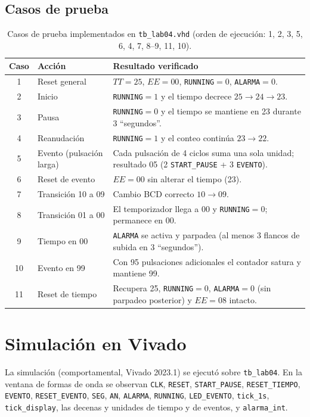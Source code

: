 \documentclass[letterpaper,12pt]{article}
\begin{document}
\subsection{Casos de prueba}
\begin{table}[H]
\centering
\caption{Casos de prueba implementados en \texttt{tb\_lab04.vhd} (orden de ejecución: 1, 2, 3, 5, 6, 4, 7, 8--9, 11, 10).}
\label{tab:casos}
\small
\begin{tabularx}{\textwidth}{|c|l|X|}
\hline
\textbf{Caso} & \textbf{Acción} & \textbf{Resultado verificado} \\ \hline
1  & Reset general & $TT=25$, $EE=00$, \texttt{RUNNING}$=0$, \texttt{ALARMA}$=0$. \\ \hline
2  & Inicio & \texttt{RUNNING}$=1$ y el tiempo decrece $25\rightarrow24\rightarrow23$. \\ \hline
3  & Pausa & \texttt{RUNNING}$=0$ y el tiempo se mantiene en 23 durante 3 ``segundos''. \\ \hline
4  & Reanudación & \texttt{RUNNING}$=1$ y el conteo continúa $23\rightarrow22$. \\ \hline
5  & Evento (pulsación larga) & Cada pulsación de 4 ciclos suma una sola unidad; resultado 05 (2 \texttt{START\_PAUSE} + 3 \texttt{EVENTO}). \\ \hline
6  & Reset de evento & $EE=00$ sin alterar el tiempo (23). \\ \hline
7  & Transición 10 a 09 & Cambio BCD correcto $10\rightarrow09$. \\ \hline
8  & Transición 01 a 00 & El temporizador llega a 00 y \texttt{RUNNING}$=0$; permanece en 00. \\ \hline
9  & Tiempo en 00 & \texttt{ALARMA} se activa y parpadea (al menos 3 flancos de subida en 3 ``segundos''). \\ \hline
10 & Evento en 99 & Con 95 pulsaciones adicionales el contador satura y mantiene 99. \\ \hline
11 & Reset de tiempo & Recupera 25, \texttt{RUNNING}$=0$, \texttt{ALARMA}$=0$ (sin parpadeo posterior) y $EE=08$ intacto. \\ \hline
\end{tabularx}
\end{table}

\section{Simulación en Vivado}
La simulación (comportamental, Vivado 2023.1) se ejecutó sobre \texttt{tb\_lab04}. En la ventana de formas de onda se observan \texttt{CLK}, \texttt{RESET}, \texttt{START\_PAUSE}, \texttt{RESET\_TIEMPO}, \texttt{EVENTO}, \texttt{RESET\_EVENTO}, \texttt{SEG}, \texttt{AN}, \texttt{ALARMA}, \texttt{RUNNING}, \texttt{LED\_EVENTO}, \texttt{tick\_1s}, \texttt{tick\_display}, las decenas y unidades de tiempo y de eventos, y \texttt{alarma\_int}.
\end{document}
